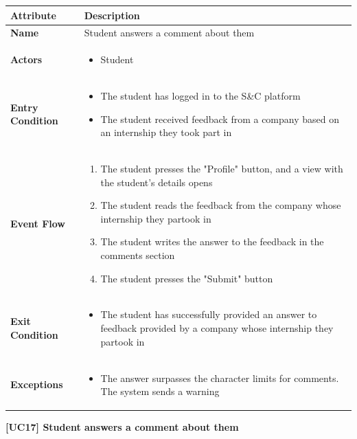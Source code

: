 \begin{center}
    
    \begin{tabular}{|p{3cm}|p{9cm}|}
    \hline
    \textbf{Attribute} & \textbf{Description} \\ \hline
    \textbf{Name} & Student answers a comment about them \\ \hline
    \textbf{Actors} & 
    \begin{itemize}
        \item Student
    \end{itemize} \\ \hline
    \textbf{Entry Condition} & 
    \begin{itemize}
        \item The student has logged in to the S\&C platform
        \item The student received feedback from a company based on an internship they took part in
    \end{itemize}\\ \hline
    \textbf{Event Flow} & 
    \begin{enumerate}
        \item The student presses the "Profile" button, and a view with the student's details opens
        \item The student reads the feedback from the company whose internship they partook in
        \item The student writes the answer to the feedback in the comments section
        \item The student presses the "Submit" button
    \end{enumerate} \\ \hline
    \textbf{Exit Condition} & 
    \begin{itemize}
        \item The student has successfully provided an answer to feedback provided by a company whose internship they partook in
        \end{itemize}\\ \hline
    \textbf{Exceptions} & 
    \begin{itemize}
        \item The answer surpasses the character limits for comments. The system sends a warning
    \end{itemize}
    \\ \hline
    \end{tabular}
    \newline
    \newline
    \textbf{[UC17] Student answers a comment about them}
    \newline
    \newline
    

\end{center}
